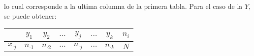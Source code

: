\documentclass[11 pts, letterpaper, twosided]{article}
\begin{document}
lo cual corresponde a la ultima columna de la primera tabla. Para el
caso de la $Y$, se puede obtener:

\begin{center}
    \begin{tabular}[c]{|c||c|c|c|c|c|c||c|}
      \hline
      \qquad &  $y_1$ & $y_2$ & $\dots$ & $y_j$ & $\dots$ & $y_k$ & $n_i$\\
      \hline
      \hline
      $x_{\cdot j}$  &  $n_{\cdot 1}$ & $n_{\cdot 2}$ & $\dots$ & $n_{\cdot j}$ & $\dots$ & $n_{\cdot k}$ & $N$\\
      \hline
    \end{tabular}
\end{center}
\end{document}
